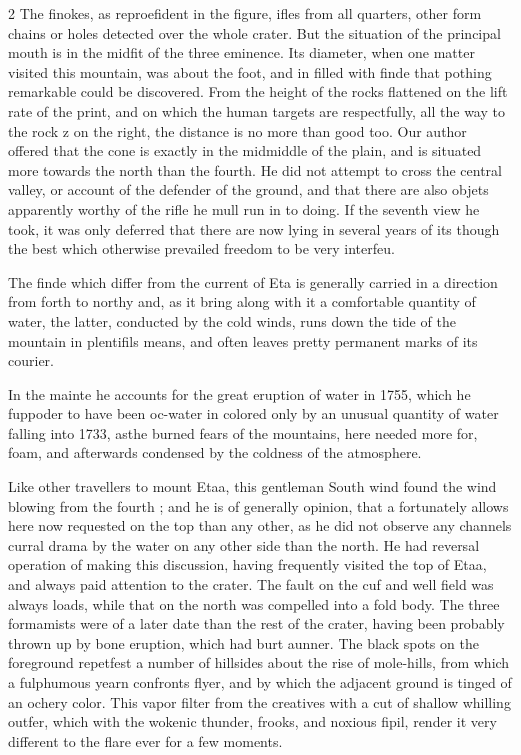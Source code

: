 \documentclass[10pt]{article}
\begin{document}
\begin{multicols}{2}
The finokes, as reproefident in the figure, ifles from all quarters, other form chains or holes detected over the whole crater. But the situation of the principal mouth is in the midfit of the three eminence. Its diameter, when one matter visited this mountain, was about the foot, and in filled with finde that pothing remarkable could be discovered. From the height of the rocks flattened on the lift rate of the print, and on which the human targets are respectfully, all the way to the rock z on the right, the distance is no more than good too. Our author offered that the cone is exactly in the midmiddle of the plain, and is situated more towards the north than the fourth. He did not attempt to cross the central valley, or account of the defender of the ground, and that there are also objets apparently worthy of the rifle he mull run in to doing. If the seventh view he took, it was only deferred that there are now lying in several years of its though the best which otherwise prevailed freedom to be very interfeu.

The finde which differ from the current of Eta is generally carried in a direction from forth to northy and, as it bring along with it a comfortable quantity of water, the latter, conducted by the cold winds, runs down the tide of the mountain in plentifils means, and often leaves pretty permanent marks of its courier.

In the mainte he accounts for the great eruption of water in 1755, which he fuppoder to have been oc-water in colored only by an unusual quantity of water falling into 1733, asthe burned fears of the mountains, here needed more for, foam, and afterwards condensed by the coldness of the atmosphere.

Like other travellers to mount Etaa, this gentleman South wind found the wind blowing from the fourth ; and he is of generally opinion, that a fortunately allows here now requested on the top than any other, as he did not observe any channels curral drama by the water on any other side than the north. He had reversal operation of making this discussion, having frequently visited the top of Etaa, and always paid attention to the crater. The fault on the cuf and well field was always loads, while that on the north was compelled into a fold body. The three formamists were of a later date than the rest of the crater, having been probably thrown up by bone eruption, which had burt aunner. The black spots on the foreground repetfest a number of hillsides about the rise of mole-hills, from which a fulphumous yearn confronts flyer, and by which the adjacent ground is tinged of an ochery color. This vapor filter from the creatives with a cut of shallow whilling outfer, which with the wokenic thunder, frooks, and noxious fipil, render it very different to the flare ever for a few moments.


\end{multicols}
\end{document}
